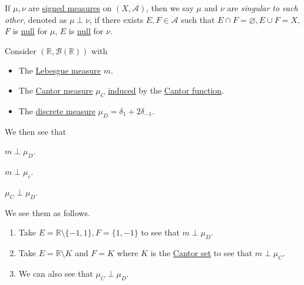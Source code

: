 \begin{definition}[Singular]\label{def:singular}
  If \(\mu,\nu\) are \hyperref[def:signed-measure]{signed measures} on \((X, \mathcal{A})\), then we say \(\mu\) and \(\nu \) are \emph{singular to each other}, denoted as
  \(\mu \perp \nu\), if there exists \(E,F \in \mathcal{A}\) such that \(E \cap F = \varnothing, E \cup F = X\), \(F\) is \hyperref[def:null-set-for-a-signed-measure]{null}
  for \(\mu\), \(E\) is \hyperref[def:null-set-for-a-signed-measure]{null} for \(\nu\).
\end{definition}

\begin{eg}
  Consider \((\mathbb{R}, \mathcal{B}(\mathbb{R}))\) with
  \begin{itemize}
    \item The \hyperref[def:Lebesgue-measure]{Lebesgue measure} \(m\).
    \item The \hyperref[def:Cantor-measure]{Cantor measure} \(\mu_C\) \hyperref[def:Lebesgue-Stieltjes-measure]{induced} by the \hyperref[sssec:Cantor-Function]{Cantor function}.
    \item The \hyperref[eg:discrete-measure]{discrete measure} \(\mu_D = \delta_1 + 2\delta_{-1}\).
  \end{itemize}

  We then see that
  \begin{enumerate*}
    \item \(m\perp \mu _D\).
    \item \(m\perp \mu _c\).
    \item \(\mu _C \perp \mu _D\).
  \end{enumerate*}
\end{eg}
\begin{explanation}
  We see them as follows.
  \begin{enumerate}
    \item Take \(E = \mathbb{R} \setminus \{-1,1\}, F = \{1,-1\}\) to see that \(m \perp \mu_D\).
    \item Take \(E = \mathbb{R} \setminus K\) and \(F = K\) where \(K\) is the \hyperref[eg:lec8:Cantor-set]{Cantor set} to see that \(m \perp \mu_C\).
    \item We can also see that \(\mu_C \perp \mu_D\).
  \end{enumerate}
\end{explanation}

